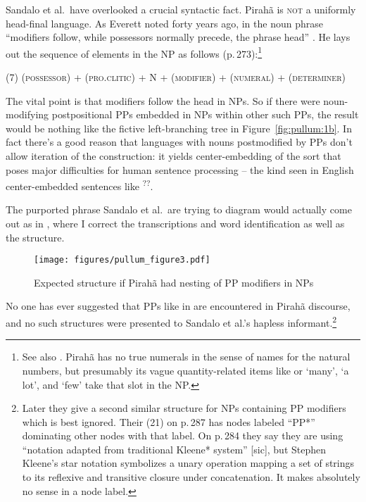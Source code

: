 \documentclass[output=paper,colorlinks,citecolor=brown
]{langscibook}
\begin{document}
Sandalo et al.\ have overlooked a crucial syntactic fact. Pirah{\~a} is
\textsc{not} a uniformly head-final language. As Everett noted forty
years ago, in the noun phrase ``modifiers follow, while possessors normally
precede, the phrase head'' \citep[272]{Everett86HAL}. He lays out
the sequence of elements in the NP as follows
(p.\,273):\footnote{\label{nonumerals}
   See also \citet[132ff]{Everett83}. Pirah{\~a} has no true
   numerals in the sense of names for the natural numbers, but presumably
   its vague quantity-related items like  or
    `many',
    `a lot', and
    `few' take that slot in the NP.}

\medskip\noindent
(7)\quad
(\textsc{possessor}) + (\textsc{pro.clitic}) + N + (\textsc{modifier})
+ (\textsc{numeral}) + (\textsc{determiner})

\medskip\noindent
The vital point is that modifiers follow the head in NPs. So if there
were noun-modifying postpositional PPs embedded in NPs within other
such PPs, the result would be nothing like the fictive left-branching
tree in Figure~\ref{fig:pullum:1b}. In fact there's a good reason that languages with nouns
postmodified by PPs don't allow iteration of the construction: it
yields center-embedding of the sort that poses major difficulties for
human sentence processing -- the kind seen in English center-embedded
sentences like \textsuperscript{??}.

The purported phrase Sandalo et al.\ are trying to diagram would
actually come out as in , where I correct the transcriptions
and word identification as well as the structure.

\begin{figure}
\texttt{[image: figures/pullum\_figure3.pdf]}
\caption{Expected structure if Pirahã had nesting of PP modifiers in NPs}
\label{fig:pullum:2}
\end{figure}

No one has ever suggested that PPs like in  are
encountered in Pirah{\~a} discourse, and no such structures were
presented to Sandalo et al.'s hapless
informant.\footnote{\label{ppstarlabels}
   Later they give a second similar structure for NPs containing PP
   modifiers which is best ignored. Their (21) on p.\,287 has nodes
   labeled ``PP*'' dominating other nodes with that label. On p.\,284
   they say they are using ``notation adapted from traditional Kleene*
   system'' [sic], but Stephen Kleene's star notation symbolizes a
   unary operation mapping a set of strings to its reflexive and
   transitive closure under concatenation. It makes absolutely no
   sense in a node label.}
\end{document}
